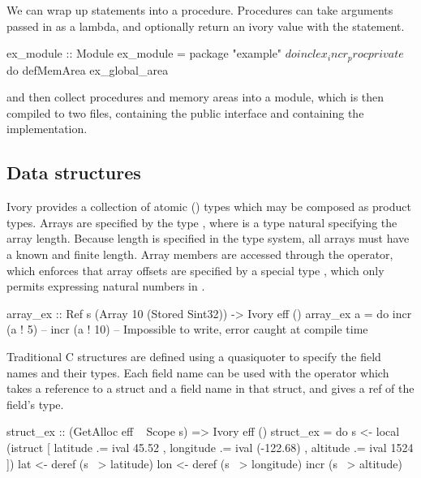 We can wrap up statements into a procedure. Procedures can take arguments
passed in as a lambda, and optionally return an ivory value with the 
statement.

\begin{code}
ex_module :: Module
ex_module = package "example" $ do
  incl ex_incr_proc
  private $ do
    defMemArea ex_global_area
\end{code}

and then collect procedures and memory areas into a module, which is then
compiled to two files,  containing the public interface and
 containing the implementation.

\subsection{Data structures}

Ivory provides a collection of atomic () types which may be composed
as product types. Arrays are specified by the type , where 
is a type natural specifying the array length. Because length is specified in
the type system, all arrays must have a known and finite length. Array
members are accessed through the \cd{!} operator, which enforces that array
offsets are specified by a special type , which only permits expressing
natural numbers in .

\begin{code}
array_ex :: Ref s (Array 10 (Stored Sint32)) -> Ivory eff ()
array_ex a = do
  incr (a ! 5)
  -- incr (a ! 10) -- Impossible to write, error caught at compile time

\end{code}

Traditional C structures are defined using a quasiquoter to specify the field
names and their types. Each field name can be used with the \cd{~>} operator
which takes a reference to a struct and a field name in that struct, and gives
a ref of the field's type.

\begin{code}

struct_ex :: (GetAlloc eff ~ Scope s) => Ivory eff ()
struct_ex = do
  s <- local (istruct [ latitude .= ival 45.52
                      , longitude .= ival (-122.68)
                      , altitude .= ival 1524 ])
  lat <- deref (s ~> latitude)
  lon <- deref (s ~> longitude)
  incr (s ~> altitude)
\end{code}


